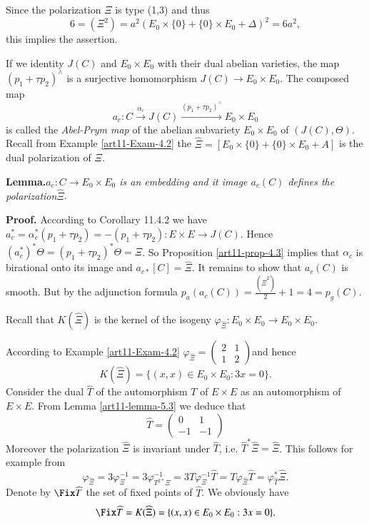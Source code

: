 Since the polarization $\Xi$ is type (1,3) and thus
$$
6 = (\Xi^{2}) =a^{2}(E_{0}\times \{0\} + \{0\} \times E_{0} + \Delta)^{2}=6a^{2},
$$
this implies the assertion.

If we identity $J(C)$ and $E_{0}\times E_{0}$ with their dual abelian varieties, the map $(p_{1} + \tau p_{2})^{\wedge}$ is a surjective homomorphism $J(C) \rightarrow E_{0}\times E_{0}$. The composed map
$$
a_{c}: C\xrightarrow{\alpha_{c}} J(C)\xrightarrow{(p_{1}+ \tau p_{2})^{\wedge}}E_{0} \times E_{0}
$$
is called the \textit{Abel-Prym map} of the abelian subvariety $E_{0}\times E_{0}$ of $(J(C), \Theta)$. Recall from Example \ref{art11-Exam-4.2} the $\widehat{\Xi} = [E_{0}\times \{0\} + \{0\} \times E_{0} + A]$ is the dual polarization of $\Xi$.

\medskip
\noindent
{\bfseries {} Lemma.\label{art11-lemma-5.5}}\textit{$a_{c}: C\rightarrow E_{0}\times E_{0}$ is an embedding and it image $a_{c}(C)$ defines the polarization}$\widehat{\Xi}$.

\medskip
\noindent
{\bfseries Proof.} According to \cite{art11-keyL-B} Corollary 11.4.2 we have $a_{c}^{*} =\alpha_{c}^{*}(p_{1} + \tau p_{2})=-(p_{1} + \tau p_{2}): E\times E \rightarrow J(C)$. Hence $(a_{c}^{*})^{*}\Theta = (p_{1} + \tau p_{2})^{*}\Theta = \Xi$. So Proposition \ref{art11-prop-4.3} implies that $\alpha_{c}$ is birational onto its image and $a_{c*}[C]=\widehat{\Xi}$. It remains to show that $a_{c}(C)$ is smooth. But by the adjunction formula $p_{a}(a_{c}(C)) =\frac{(\widehat{\Xi}^{2})}{2} + 1 =4 = p_{g}(C)$.

Recall that $K (\widehat{\Xi})$ is the kernel of the isogeny $\varphi_{\widehat{\Xi}}: E_{0} \times E_{0} \rightarrow E_{0} \times E_{0}$.

According to Example \ref{art11-Exam-4.2}
$\varphi_{\widehat{\Xi}}= \begin{pmatrix}
2 & 1\\
1 & 2
\end{pmatrix}
$and hence
$$
K(\widehat{\Xi}) = \{(x,x) \in E_{0} \times E_{0}: 3x =0\}.
$$
Consider the dual $\widehat{T}$ of the automorphism $T$ of $E \times E$ as an automorphism
of  $ E\times E$. From Lemma \ref{art11-lemma-5.3} we deduce that
$$
\widehat{T}=\begin{pmatrix}
0 & 1\\
-1 & -1
\end{pmatrix}
$$
Moreover the polarization $\widehat{\Xi}$ is invariant under $\widehat{T}$, i.e. $\widehat{T}^{*}\widehat{\Xi} = \widehat{\Xi}$. This follows for example from
$$
\varphi_{\widehat{\Xi}} =3 \varphi_{\Xi}^{-1} = 3\varphi_{T^{2*}\Xi}^{-1} = 3 T\varphi_{\Xi}^{-1}\widehat{T}= T \varphi_{\widehat{\Xi}}\widehat{T} = \varphi_{\widehat{T}}^{*} \widehat{\Xi}.
$$
Denote by $\Fix\widehat{T}$ the set of fixed points of $\widehat{T}$. We obviously have
$$
\Fix\widehat{T}=K(\widehat{\Xi}) = \{(x,x) \in E_{0} \times E_{0}: 3x =0\}.
$$ 

